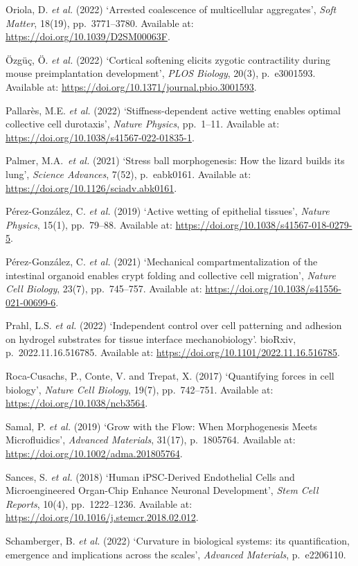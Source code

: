 \documentclass[
]{article}
\begin{document}
Oriola, D. \emph{et al.} (2022) `Arrested coalescence of multicellular
aggregates', \emph{Soft Matter}, 18(19), pp.~3771--3780. Available at:
\url{https://doi.org/10.1039/D2SM00063F}.

Özgüç, Ö. \emph{et al.} (2022) `Cortical softening elicits zygotic
contractility during mouse preimplantation development', \emph{PLOS
Biology}, 20(3), p.~e3001593. Available at:
\url{https://doi.org/10.1371/journal.pbio.3001593}.

Pallarès, M.E. \emph{et al.} (2022) `Stiffness-dependent active wetting
enables optimal collective cell durotaxis', \emph{Nature Physics},
pp.~1--11. Available at:
\url{https://doi.org/10.1038/s41567-022-01835-1}.

Palmer, M.A.~\emph{et al.} (2021) `Stress ball morphogenesis: How the
lizard builds its lung', \emph{Science Advances}, 7(52), p.~eabk0161.
Available at: \url{https://doi.org/10.1126/sciadv.abk0161}.

Pérez-González, C. \emph{et al.} (2019) `Active wetting of epithelial
tissues', \emph{Nature Physics}, 15(1), pp.~79--88. Available at:
\url{https://doi.org/10.1038/s41567-018-0279-5}.

Pérez-González, C. \emph{et al.} (2021) `Mechanical compartmentalization
of the intestinal organoid enables crypt folding and collective cell
migration', \emph{Nature Cell Biology}, 23(7), pp.~745--757. Available
at: \url{https://doi.org/10.1038/s41556-021-00699-6}.

Prahl, L.S. \emph{et al.} (2022) `Independent control over cell
patterning and adhesion on hydrogel substrates for tissue interface
mechanobiology'. bioRxiv, p.~2022.11.16.516785. Available at:
\url{https://doi.org/10.1101/2022.11.16.516785}.

Roca-Cusachs, P., Conte, V. and Trepat, X. (2017) `Quantifying forces in
cell biology', \emph{Nature Cell Biology}, 19(7), pp.~742--751.
Available at: \url{https://doi.org/10.1038/ncb3564}.

Samal, P. \emph{et al.} (2019) `Grow with the Flow: When Morphogenesis
Meets Microfluidics', \emph{Advanced Materials}, 31(17), p.~1805764.
Available at: \url{https://doi.org/10.1002/adma.201805764}.

Sances, S. \emph{et al.} (2018) `Human iPSC-Derived Endothelial Cells
and Microengineered Organ-Chip Enhance Neuronal Development', \emph{Stem
Cell Reports}, 10(4), pp.~1222--1236. Available at:
\url{https://doi.org/10.1016/j.stemcr.2018.02.012}.

Schamberger, B. \emph{et al.} (2022) `Curvature in biological systems:
its quantification, emergence and implications across the scales',
\emph{Advanced Materials}, p.~e2206110.
\end{document}
